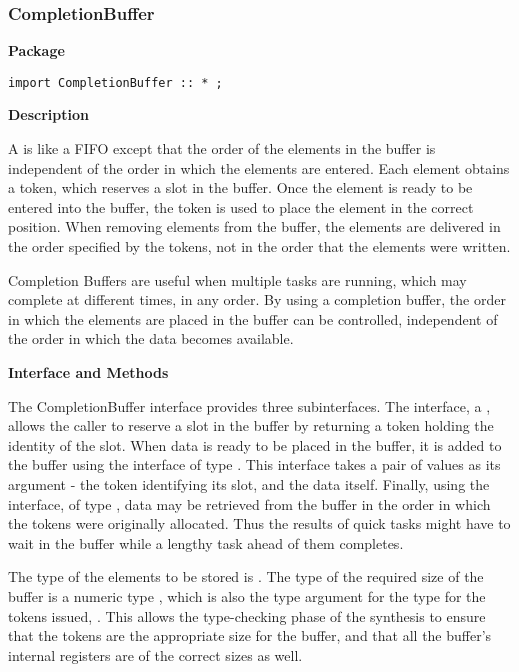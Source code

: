 \subsubsection{CompletionBuffer}
\label{lib-completionbuffer}

{\bf Package}


\begin{verbatim}
import CompletionBuffer :: * ;
\end{verbatim}

{\bf Description}

A  is like a FIFO except that the order of the
elements in the buffer is independent of the order in which  the elements
are  entered.  Each element obtains a token, which
reserves a slot in the buffer.  Once the element is ready to be
entered into the buffer, the token is used to place the element in the
correct position. 
When removing elements from the buffer, the elements
are delivered in the order specified by the tokens, not in the order
that the  elements were written.  

Completion Buffers are useful when
multiple tasks are running, which may complete at different times, in
any order.  By using a completion buffer, the order in which the elements
are placed in the buffer can be controlled, independent of the order
in which the data becomes available.

{\bf Interface and Methods}

The CompletionBuffer interface provides three subinterfaces.  The 
interface, a ,  allows the caller to reserve a slot in the
buffer by returning  a token holding the identity of the slot.  When
data is  ready
to be placed in the buffer, 
it is added to the buffer using the  interface of type
. This interface
takes a pair of values as its argument - the token identifying its slot,
and the data itself.  Finally, using the  interface, of type
, data may be retrieved from the buffer
 in the order in which the
tokens were originally allocated.  Thus the results of quick tasks might
have to wait in the buffer while a lengthy task ahead of them completes.

The type of the elements
to be stored is .  The type of the required size of
the buffer is a numeric type  , which  is also the type argument for
 the type for the tokens issued, .  This allows the type-checking 
phase of the synthesis to ensure that the tokens are the appropriate size
for the buffer, and that all the buffer's internal registers are of the
correct sizes as well.


